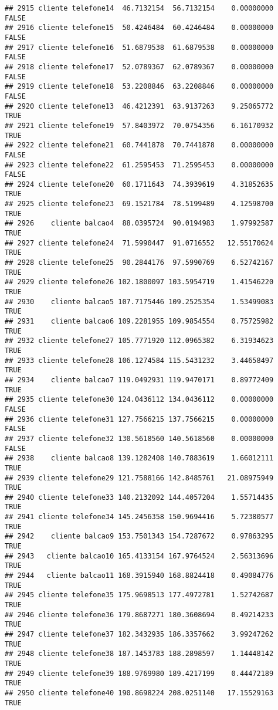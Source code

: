 \documentclass[
]{article}
\begin{document}
\begin{verbatim}
## 2915 cliente telefone14  46.7132154  56.7132154    0.00000000    FALSE
## 2916 cliente telefone15  50.4246484  60.4246484    0.00000000    FALSE
## 2917 cliente telefone16  51.6879538  61.6879538    0.00000000    FALSE
## 2918 cliente telefone17  52.0789367  62.0789367    0.00000000    FALSE
## 2919 cliente telefone18  53.2208846  63.2208846    0.00000000    FALSE
## 2920 cliente telefone13  46.4212391  63.9137263    9.25065772     TRUE
## 2921 cliente telefone19  57.8403972  70.0754356    6.16170932     TRUE
## 2922 cliente telefone21  60.7441878  70.7441878    0.00000000    FALSE
## 2923 cliente telefone22  61.2595453  71.2595453    0.00000000    FALSE
## 2924 cliente telefone20  60.1711643  74.3939619    4.31852635     TRUE
## 2925 cliente telefone23  69.1521784  78.5199489    4.12598700     TRUE
## 2926    cliente balcao4  88.0395724  90.0194983    1.97992587     TRUE
## 2927 cliente telefone24  71.5990447  91.0716552   12.55170624     TRUE
## 2928 cliente telefone25  90.2844176  97.5990769    6.52742167     TRUE
## 2929 cliente telefone26 102.1800097 103.5954719    1.41546220     TRUE
## 2930    cliente balcao5 107.7175446 109.2525354    1.53499083     TRUE
## 2931    cliente balcao6 109.2281955 109.9854554    0.75725982     TRUE
## 2932 cliente telefone27 105.7771920 112.0965382    6.31934623     TRUE
## 2933 cliente telefone28 106.1274584 115.5431232    3.44658497     TRUE
## 2934    cliente balcao7 119.0492931 119.9470171    0.89772409     TRUE
## 2935 cliente telefone30 124.0436112 134.0436112    0.00000000    FALSE
## 2936 cliente telefone31 127.7566215 137.7566215    0.00000000    FALSE
## 2937 cliente telefone32 130.5618560 140.5618560    0.00000000    FALSE
## 2938    cliente balcao8 139.1282408 140.7883619    1.66012111     TRUE
## 2939 cliente telefone29 121.7588166 142.8485761   21.08975949     TRUE
## 2940 cliente telefone33 140.2132092 144.4057204    1.55714435     TRUE
## 2941 cliente telefone34 145.2456358 150.9694416    5.72380577     TRUE
## 2942    cliente balcao9 153.7501343 154.7287672    0.97863295     TRUE
## 2943   cliente balcao10 165.4133154 167.9764524    2.56313696     TRUE
## 2944   cliente balcao11 168.3915940 168.8824418    0.49084776     TRUE
## 2945 cliente telefone35 175.9698513 177.4972781    1.52742687     TRUE
## 2946 cliente telefone36 179.8687271 180.3608694    0.49214233     TRUE
## 2947 cliente telefone37 182.3432935 186.3357662    3.99247262     TRUE
## 2948 cliente telefone38 187.1453783 188.2898597    1.14448142     TRUE
## 2949 cliente telefone39 188.9769980 189.4217199    0.44472189     TRUE
## 2950 cliente telefone40 190.8698224 208.0251140   17.15529163     TRUE

\end{verbatim}
\end{document}
